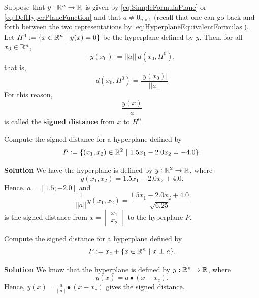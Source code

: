 \begin{tcolorbox}[sharp corners, colback=green!30, colframe=green!80!blue, title=\textbf{\large Signed Distance to a Hyperplane}]
Suppose that $y:\mathbb R^n \to \mathbb R$ is given by \eqref{eq:SimpleFormulaPlane} or \eqref{eq:DefHyperPlaneFunction} and that $a \neq 0_{n \times 1}$ (recall that one can go back and forth between the two representations by \eqref{eq:HyperplaneEquivalentFormulas}). Let
$H^0:=\{x \in \mathbb R^n~|~ y(x) = 0 \}$ be the hyperplane defined by $y$. Then, for all $x_0 \in \mathbb R^n$,
$$ |y(x_0)|= ||a||~d(x_0, H^0), $$
that is, 
$$d(x_0, H^0) = \frac{|y(x_0)|}{||a||} $$
For this reason, 
\begin{equation}
\label{eq:SignedDistance}
\frac{y(x)}{||a||}
\end{equation}
is called the \textbf{signed distance} from $x$ to $H^0$. 

\end{tcolorbox}

\vspace*{0.2cm}

\begin{example}
\label{ex:SignedDistance01} Compute the signed distance for a hyperplane defined by
$$P:=\{(x_1, x_2) \in \mathbb R^2~|~ 1.5 x_1 - 2.0 x_2 = -4.0\}. $$
\end{example}

\textbf{Solution} We have the hyperplane is defined by $y:\mathbb R^2 \to \mathbb R$, where 
$$y(x_1,x_2)= 1.5 x_1 - 2.0 x_2 + 4.0 .$$
Hence, $a=[1.5; -2.0]$ and 
 $$\frac{1}{||a||}y(x_1,x_2)=\frac{1.5 x_1 - 2.0 x_2 + 4.0}{\sqrt{6.25}}$$ is the signed distance from $x=\begin{bmatrix}
x_1\\x_2
\end{bmatrix}$ to the hyperplane $P$.

\Qed

\vspace*{0.2cm}

\begin{example}
\label{ex:SignedDistance02} Compute the signed distance for a hyperplane defined by
$$P:=x_c + \{ x \in \mathbb R^n~|~ x \perp a\}. $$
\end{example}

\textbf{Solution} We know that the hyperplane is defined by $y:\mathbb R^n \to \mathbb R$, where 
$$y(x)=a\bullet(x-x_c).$$
Hence, $y(x)=\frac{a}{||a||}\bullet(x-x_c)$ gives the signed distance. 
\Qed

\vspace*{0.2cm}

